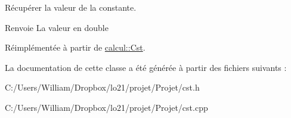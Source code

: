 Récupérer la valeur de la constante. 

\begin{DoxyReturn}{Renvoie}
La valeur en double 
\end{DoxyReturn}


Réimplémentée à partir de \hyperlink{classcalcul_1_1_cst}{calcul\-::\-Cst}.



La documentation de cette classe a été générée à partir des fichiers suivants \-:\begin{DoxyCompactItemize}
\item 
C\-:/\-Users/\-William/\-Dropbox/lo21/projet/\-Projet/cst.\-h\item 
C\-:/\-Users/\-William/\-Dropbox/lo21/projet/\-Projet/cst.\-cpp\end{DoxyCompactItemize}
